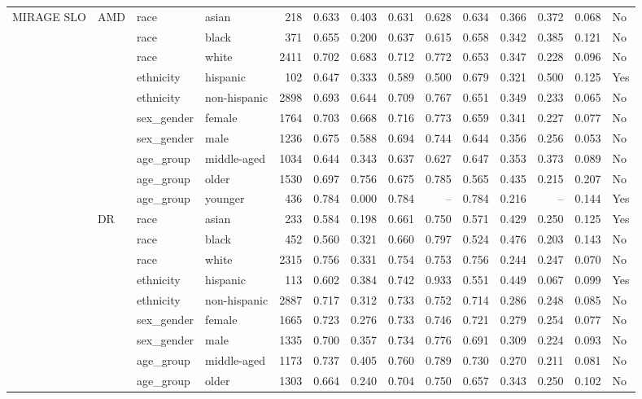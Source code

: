 \begin{longtable}{@{}lll l rrrrrrrr@{}}
MIRAGE SLO & AMD & race & asian & 218 & 0.633 & 0.403 & 0.631 & 0.628 & 0.634 & 0.366 & 0.372 & 0.068 & No \\
 &  & race & black & 371 & 0.655 & 0.200 & 0.637 & 0.615 & 0.658 & 0.342 & 0.385 & 0.121 & No \\
 &  & race & white & 2411 & 0.702 & 0.683 & 0.712 & 0.772 & 0.653 & 0.347 & 0.228 & 0.096 & No \\
 &  & ethnicity & hispanic & 102 & 0.647 & 0.333 & 0.589 & 0.500 & 0.679 & 0.321 & 0.500 & 0.125 & Yes \\
 &  & ethnicity & non-hispanic & 2898 & 0.693 & 0.644 & 0.709 & 0.767 & 0.651 & 0.349 & 0.233 & 0.065 & No \\
 &  & sex\_gender & female & 1764 & 0.703 & 0.668 & 0.716 & 0.773 & 0.659 & 0.341 & 0.227 & 0.077 & No \\
 &  & sex\_gender & male & 1236 & 0.675 & 0.588 & 0.694 & 0.744 & 0.644 & 0.356 & 0.256 & 0.053 & No \\
 &  & age\_group & middle-aged & 1034 & 0.644 & 0.343 & 0.637 & 0.627 & 0.647 & 0.353 & 0.373 & 0.089 & No \\
 &  & age\_group & older & 1530 & 0.697 & 0.756 & 0.675 & 0.785 & 0.565 & 0.435 & 0.215 & 0.207 & No \\
 &  & age\_group & younger & 436 & 0.784 & 0.000 & 0.784 & -- & 0.784 & 0.216 & -- & 0.144 & Yes \\
 & DR & race & asian & 233 & 0.584 & 0.198 & 0.661 & 0.750 & 0.571 & 0.429 & 0.250 & 0.125 & Yes \\
 &  & race & black & 452 & 0.560 & 0.321 & 0.660 & 0.797 & 0.524 & 0.476 & 0.203 & 0.143 & No \\
 &  & race & white & 2315 & 0.756 & 0.331 & 0.754 & 0.753 & 0.756 & 0.244 & 0.247 & 0.070 & No \\
 &  & ethnicity & hispanic & 113 & 0.602 & 0.384 & 0.742 & 0.933 & 0.551 & 0.449 & 0.067 & 0.099 & Yes \\
 &  & ethnicity & non-hispanic & 2887 & 0.717 & 0.312 & 0.733 & 0.752 & 0.714 & 0.286 & 0.248 & 0.085 & No \\
 &  & sex\_gender & female & 1665 & 0.723 & 0.276 & 0.733 & 0.746 & 0.721 & 0.279 & 0.254 & 0.077 & No \\
 &  & sex\_gender & male & 1335 & 0.700 & 0.357 & 0.734 & 0.776 & 0.691 & 0.309 & 0.224 & 0.093 & No \\
 &  & age\_group & middle-aged & 1173 & 0.737 & 0.405 & 0.760 & 0.789 & 0.730 & 0.270 & 0.211 & 0.081 & No \\
 &  & age\_group & older & 1303 & 0.664 & 0.240 & 0.704 & 0.750 & 0.657 & 0.343 & 0.250 & 0.102 & No \\

\end{longtable}
